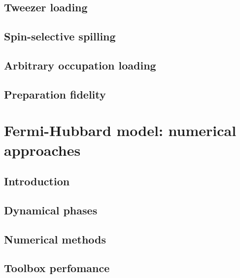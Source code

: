 \documentclass[twoside]{article}
\begin{document}
\subsection{Tweezer loading} \label{subsec:tweezer-loading}


\subsection{Spin-selective spilling} \label{subsec:spin-selective-spilling}


\subsection{Arbitrary occupation loading} \label{subsec:arbitrary-occupation-loading}


\subsection{Preparation fidelity} \label{subsec:prep-fidelity}


\newpage
\section{Fermi-Hubbard model: numerical approaches} \label{sec:fhmodel}

\subsection{Introduction}

\subsection{Dynamical phases}

\subsection{Numerical methods}

\subsection{Toolbox perfomance}
\end{document}
